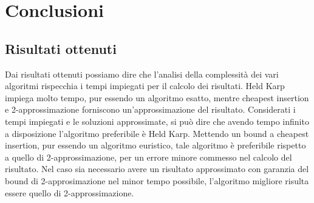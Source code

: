\chapter{Conclusioni\label{sec:conclusioni}}

\section{Risultati ottenuti\label{sec:risultati-ottenuti}}
Dai risultati ottenuti possiamo dire che l'analisi della complessità dei vari algoritmi rispecchia i tempi impiegati per il calcolo dei risultati.
Held Karp impiega molto tempo, pur essendo un algoritmo esatto, mentre cheapest insertion e 2-approssimazione forniscono un'approssimazione del risultato.
Considerati i tempi impiegati e le soluzioni approssimate, si può dire che avendo tempo infinito a disposizione l'algoritmo preferibile è Held Karp.
Mettendo un bound a cheapest insertion, pur essendo un algoritmo euristico, tale algoritmo è preferibile rispetto a quello di 2-approssimazione, per un errore minore commesso nel calcolo del risultato.
Nel caso sia necessario avere un risultato approssimato con garanzia del bound di 2-approsimazione nel minor tempo possibile, l'algoritmo migliore risulta essere quello di 2-approssimazione.